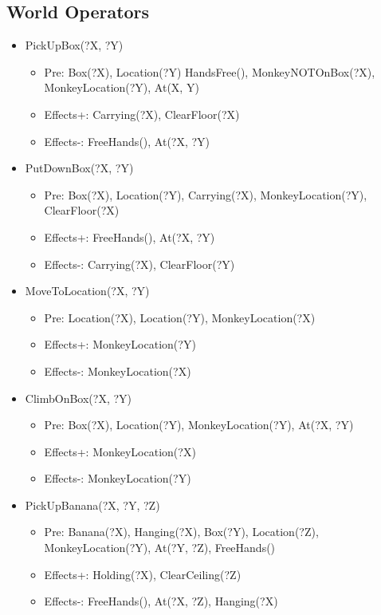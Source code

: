 \documentclass{article}
\begin{document}
\subsection*{World Operators}
\begin{itemize}
    \item PickUpBox(?X, ?Y)
        \begin{itemize}
            \item Pre: Box(?X), Location(?Y) HandsFree(), MonkeyNOTOnBox(?X), 
                MonkeyLocation(?Y), At(X, Y)
            \item Effects+: Carrying(?X), ClearFloor(?X)
            \item Effects-: FreeHands(), At(?X, ?Y)
        \end{itemize}
    \item PutDownBox(?X, ?Y)
        \begin{itemize}
            \item Pre: Box(?X), Location(?Y), Carrying(?X), MonkeyLocation(?Y),
                ClearFloor(?X)
            \item Effects+: FreeHands(), At(?X, ?Y)
            \item Effects-: Carrying(?X), ClearFloor(?Y)
        \end{itemize}
    \item MoveToLocation(?X, ?Y)
        \begin{itemize}
            \item Pre: Location(?X), Location(?Y), MonkeyLocation(?X)
            \item Effects+: MonkeyLocation(?Y)
            \item Effects-: MonkeyLocation(?X)
        \end{itemize}
    \item ClimbOnBox(?X, ?Y)
        \begin{itemize}
            \item Pre: Box(?X), Location(?Y), MonkeyLocation(?Y), At(?X, ?Y)
            \item Effects+: MonkeyLocation(?X)
            \item Effects-: MonkeyLocation(?Y)
        \end{itemize}
    \item PickUpBanana(?X, ?Y, ?Z)
        \begin{itemize}
            \item Pre: Banana(?X), Hanging(?X),  Box(?Y), Location(?Z),
                MonkeyLocation(?Y), At(?Y, ?Z), FreeHands()
            \item Effects+: Holding(?X), ClearCeiling(?Z)
            \item Effects-: FreeHands(), At(?X, ?Z), Hanging(?X)
        \end{itemize}
\end{itemize}
\end{document}
